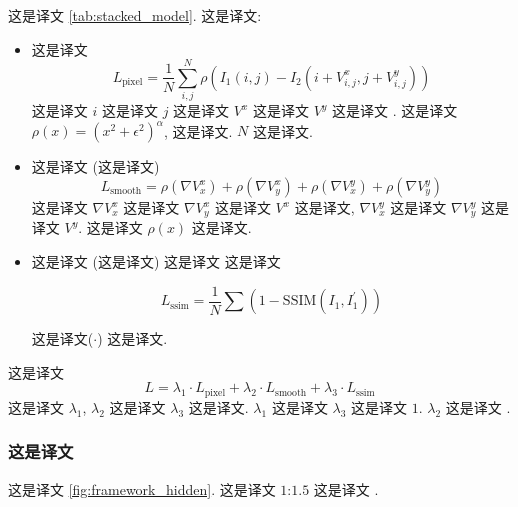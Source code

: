 \documentclass[sigconf]{acmart}
\begin{document}
	这是译文 \ref{tab:stacked_model}. 这是译文:
	\begin{itemize}
		\item 这是译文  \begin{equation}
			L_{\text{pixel}} = \frac{1}{N} \sum_{i, j}^{N} \rho ( I_{1}(i, j) - I_{2}(i+V_{i,j}^{x}, j+V_{i,j}^{y}) )
			\label{eq:pixel_loss}
		\end{equation}  这是译文 $i$ 这是译文 $j$ 这是译文 $V^x$ 这是译文 $V^y$ 这是译文 \cite{stn_nips15}. 这是译文 $\rho(x) = (x^{2} + \epsilon^{2})^{\alpha}$, 这是译文.  $N$ 这是译文.
		
		\item 这是译文 (这是译文)  \begin{equation}
			L_{\text{smooth}} = \rho (\nabla V_{x}^{x} ) + \rho ( \nabla V_{y}^{x}) + \rho ( \nabla V_{x}^{y}) + \rho ( \nabla V_{y}^{y})
			\label{eq:smoothness_loss}
		\end{equation}  这是译文 $\nabla V_{x}^{x}$ 这是译文 $\nabla V_{y}^{x}$ 这是译文 $V^{x}$ 这是译文, $\nabla V_{x}^{y}$ 这是译文 $\nabla V_{y}^{y}$ 这是译文 $V^{y}$. 这是译文 $\rho(x)$ 这是译文.
		
		\item 这是译文 (这是译文) 这是译文 \cite{SSIM_2004} 这是译文
		
		\begin{equation}
			L_{\text{ssim}} = \frac{1}{N} \sum ( 1 - \text{SSIM} (I_{1}, I_{1}^{\prime}) )
			\label{eq:ssim_loss}
		\end{equation}
		
		这是译文($\cdot$) 这是译文.
	\end{itemize}
	
	这是译文  \begin{equation}
		L = \lambda_{1} \cdot L_{\text{pixel}} + \lambda_{2} \cdot L_{\text{smooth}}  + \lambda_{3} \cdot L_{\text{ssim}}
		\label{eq:total_unsup_loss}
	\end{equation}  这是译文 $\lambda_{1}$, $\lambda_{2}$ 这是译文 $\lambda_{3}$ 这是译文. $\lambda_{1}$ 这是译文 $\lambda_{3}$ 这是译文 $1$. $\lambda_{2}$ 这是译文 \cite{flownet}.
	
	\subsubsection{\textbf{这是译文}}
	\label{sec:stacked_temporal_stream}  这是译文 \ref{fig:framework_hidden}. 这是译文 $1$:$1.5$ 这是译文 \cite{wanggoodpractice2015,TSN2016,diba_tle_2016}.
	
\end{document}
